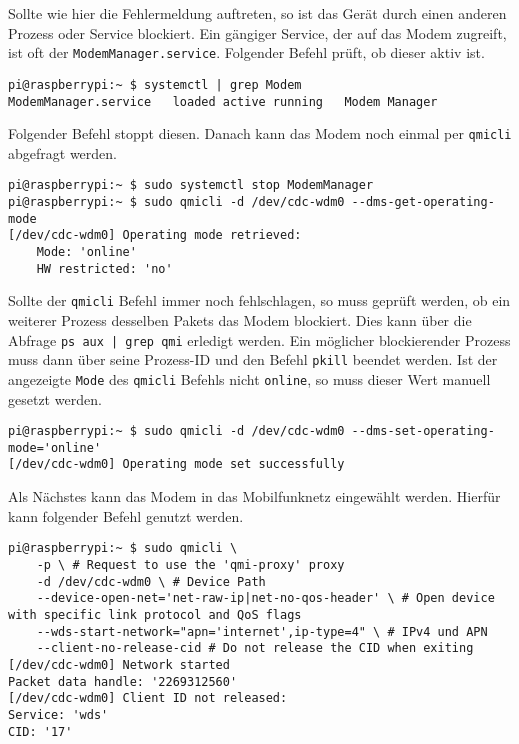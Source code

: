 \noindent Sollte wie hier die Fehlermeldung auftreten, so ist das Gerät durch einen anderen Prozess oder Service blockiert.
Ein gängiger Service, der auf das Modem zugreift, ist oft der \texttt{ModemManager.service}.
Folgender Befehl prüft, ob dieser aktiv ist.

\begin{lstlisting}
pi@raspberrypi:~ $ systemctl | grep Modem
ModemManager.service   loaded active running   Modem Manager
\end{lstlisting}

\noindent Folgender Befehl stoppt diesen.
Danach kann das Modem noch einmal per \texttt{qmicli} abgefragt werden.

\begin{lstlisting}
pi@raspberrypi:~ $ sudo systemctl stop ModemManager
pi@raspberrypi:~ $ sudo qmicli -d /dev/cdc-wdm0 --dms-get-operating-mode
[/dev/cdc-wdm0] Operating mode retrieved:
	Mode: 'online'
	HW restricted: 'no'
\end{lstlisting}

\noindent Sollte der \texttt{qmicli} Befehl immer noch fehlschlagen, so muss geprüft werden, ob ein weiterer Prozess desselben
Pakets das Modem blockiert. 
Dies kann über die Abfrage \texttt{ps aux | grep qmi} erledigt werden.
Ein möglicher blockierender Prozess muss dann über seine Prozess-ID und den Befehl \texttt{pkill} beendet werden.
Ist der angezeigte \texttt{Mode} des \texttt{qmicli} Befehls nicht \texttt{online}, so muss dieser Wert manuell gesetzt
werden.

\begin{lstlisting}
pi@raspberrypi:~ $ sudo qmicli -d /dev/cdc-wdm0 --dms-set-operating-mode='online'
[/dev/cdc-wdm0] Operating mode set successfully
\end{lstlisting}



Als Nächstes kann das Modem in das Mobilfunknetz eingewählt werden.
Hierfür kann folgender Befehl genutzt werden.

\begin{lstlisting}
pi@raspberrypi:~ $ sudo qmicli \
    -p \ # Request to use the 'qmi-proxy' proxy
    -d /dev/cdc-wdm0 \ # Device Path
    --device-open-net='net-raw-ip|net-no-qos-header' \ # Open device with specific link protocol and QoS flags
    --wds-start-network="apn='internet',ip-type=4" \ # IPv4 und APN
    --client-no-release-cid # Do not release the CID when exiting
[/dev/cdc-wdm0] Network started
Packet data handle: '2269312560'
[/dev/cdc-wdm0] Client ID not released:
Service: 'wds'
CID: '17'
\end{lstlisting}

